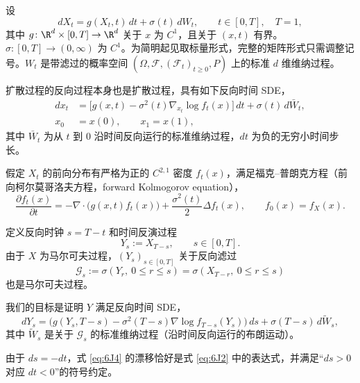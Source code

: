 

设
\begin{equation*}
  dX_t=g(X_t,t)\,dt+\sigma(t)\,dW_t,\qquad t\in[0,T],\quad T=1,
  \tag{6J1}\label{eq:6J1}
\end{equation*}
其中 $g\colon\R^d\times[0,T]\to\R^d$ 关于 $x$ 为 $C^1$，且关于 $(x,t)$ 有界。$\sigma\colon[0,T]\to(0,\infty)$ 为 $C^1$。为简明起见取标量形式，完整的矩阵形式只需调整记号。$W_t$ 是带滤过的概率空间 $(\Omega,\mathcal F,(\mathcal F_t)_{t\geq0},P)$ 上的标准 $d$ 维维纳过程。

扩散过程的反向过程本身也是扩散过程，具有如下反向时间 SDE，
\begin{equation*}
  \begin{aligned}
   dx_t&=\bigl[g(x,t)-\sigma^2(t)\nabla_{x_t}\log f_t(x)\bigr]\,dt
           +\sigma(t)\,d\bar W_t,\\
   x_0&=x(0),\qquad x_1=x(1),
  \end{aligned}
  \tag{6J2}\label{eq:6J2}
\end{equation*}
其中 $\bar W_t$ 为从 $t$ 到 0 沿时间反向运行的标准维纳过程，$dt$ 为负的无穷小时间步长。

假定 $X_t$ 的前向分布有严格为正的 $C^{2,1}$ 密度 $f_t(x)$，满足福克–普朗克方程（前向柯尔莫哥洛夫方程，forward Kolmogorov equation），
\begin{equation*}
  \frac{\partial f_t(x)}{\partial t}
   =-\nabla\cdot\bigl(g(x,t)f_t(x)\bigr)
     +\frac{\sigma^2(t)}2\Delta f_t(x),\qquad f_0(x)=f_X(x).
  \tag{6J3}\label{eq:6J3}
\end{equation*}


定义反向时钟 $s=T-t$ 和时间反演过程
\[
  Y_s:=X_{T-s},\qquad s\in[0,T].
\]
由于 $X$ 为马尔可夫过程，$(Y_s)_{s\in[0,T]}$ 关于反向滤过
\[
  \mathcal G_s:=\sigma(Y_r,\ 0\leq r\leq s)
             =\sigma(X_{T-r},\ 0\leq r\leq s)
\]
也是马尔可夫过程。

我们的目标是证明 $Y$ 满足反向时间 SDE，
\begin{equation*}
  dY_s=\bigl(g(Y_s,T-s)-\sigma^2(T-s)\nabla\log f_{T-s}(Y_s)\bigr)\,ds
        +\sigma(T-s)\,d\tilde W_s,
  \tag{6J4}\label{eq:6J4}
\end{equation*}
其中 $\tilde W_s$ 是关于 $\mathcal G_s$ 的标准维纳过程（沿时间反向运行的布朗运动）。

由于 $ds=-dt$，式 \eqref{eq:6J4} 的漂移恰好是式 \eqref{eq:6J2} 中的表达式，并满足“$ds>0$ 对应 $dt<0$”的符号约定。

